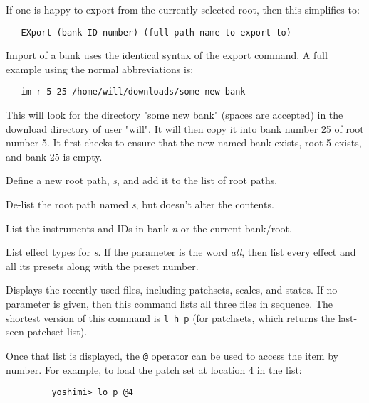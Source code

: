    If one is happy to export from the currently selected root, then this
   simplifies to:

\begin{verbatim}
   EXport (bank ID number) (full path name to export to)
\end{verbatim}

      Import of a bank uses the identical syntax of the export command.
      A full example using the normal abbreviations is:

\begin{verbatim}
   im r 5 25 /home/will/downloads/some new bank
\end{verbatim}

      This will look for the directory "some new bank" (spaces are accepted) in
      the download directory of user "will". It will then copy it into bank number
      25 of root number 5. It first checks to ensure that the new named bank
      exists, root 5 exists, and bank 25 is empty.

      Define a new root path, \textsl{s}, and add it to the list of root paths.

      De-list the root path named \textsl{s}, but doesn't alter the contents.

      List the instruments and IDs in bank \textsl{n} or the
      current bank/root.

      List effect types for \textsl{s}.
      If the parameter is the word \textsl{all},
      then list every effect and all its
      presets along with the preset number.

      Displays the recently-used files, including patchsets, scales, and
      states.  If no parameter is given, then this command lists all three
      files in sequence.  The shortest version of this command is
      \texttt{l h p} (for patchsets, which returns the last-seen patchset list).

      Once that list is displayed,
      the \texttt{@} operator can be used to access
      the item by number.  For example, to load the patch set at location 4 in
      the list:

      \begin{verbatim}
         yoshimi> lo p @4
      \end{verbatim}

